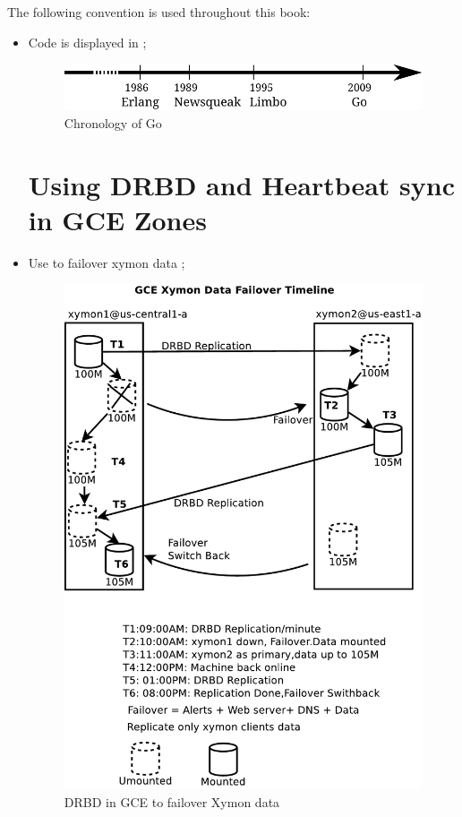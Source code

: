 The following convention is used throughout this book:
\begin{itemize}
\item Code is displayed in ;

\begin{figure}[H]
\caption{Chronology of Go}
\label{fig:chrono-of-go2}
\begin{center}
\includegraphics[scale=0.65]{fig/go-history.pdf}
\end{center}
\end{figure}

\section{Using DRBD and Heartbeat sync in GCE Zones}
\item Use  to failover xymon data ;

\begin{figure}[H]
\caption{DRBD in GCE to failover Xymon data}
\label{gce-xymon-failover-drbd}
\begin{center}
\includegraphics[scale=0.65]{dia/gce-xymon-failover-drbd.pdf}
\end{center}
\end{figure}


\end{itemize}
